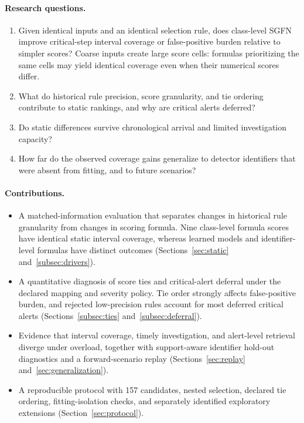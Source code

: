 \documentclass[pdflatex,sn-basic,Numbered]{sn-jnl}
\newcommand{\NCandidates}{157}
\begin{document}
\paragraph{Research questions.}
\begin{enumerate}[label=RQ\arabic*,leftmargin=*]
\item Given identical inputs and an identical selection rule, does class-level SGFN improve critical-step interval coverage or false-positive burden relative to simpler scores? Coarse inputs create large score cells: formulas prioritizing the same cells may yield identical coverage even when their numerical scores differ.
\item What do historical rule precision, score granularity, and tie ordering contribute to static rankings, and why are critical alerts deferred?
\item Do static differences survive chronological arrival and limited investigation capacity?
\item How far do the observed coverage gains generalize to detector identifiers that were absent from fitting, and to future scenarios?
\end{enumerate}

\paragraph{Contributions.}
\begin{itemize}[leftmargin=*]
\item A matched-information evaluation that separates changes in historical rule granularity from changes in scoring formula. Nine class-level formula scores have identical static interval coverage, whereas learned models and identifier-level formulas have distinct outcomes (Sections~\ref{sec:static} and~\ref{subsec:drivers}).
\item A quantitative diagnosis of score ties and critical-alert deferral under the declared mapping and severity policy. Tie order strongly affects false-positive burden, and rejected low-precision rules account for most deferred critical alerts (Sections~\ref{subsec:ties} and~\ref{subsec:deferral}).
\item Evidence that interval coverage, timely investigation, and alert-level retrieval diverge under overload, together with support-aware identifier hold-out diagnostics and a forward-scenario replay (Sections~\ref{sec:replay} and~\ref{sec:generalization}).
\item A reproducible protocol with \NCandidates{} candidates, nested selection, declared tie ordering, fitting-isolation checks, and separately identified exploratory extensions (Section~\ref{sec:protocol}).
\end{itemize}
\end{document}
